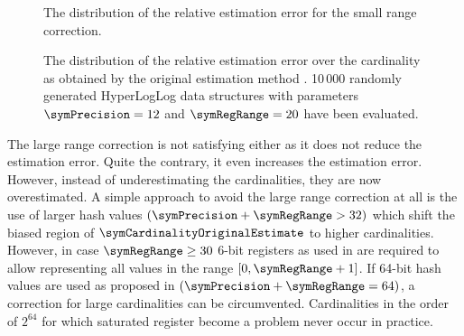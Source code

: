 \documentclass[a4paper]{scrartcl}
\begin{document}
\begin{figure}
\centering

\caption{The distribution of the relative estimation error for the small range correction.}
\label{fig:small_range_estimate}
\end{figure}

\begin{figure}
\centering

\caption{The distribution of the relative estimation error over the cardinality as obtained by the original estimation method \cite{Flajolet2007}. 10\,000 randomly generated HyperLogLog data structures with parameters $\symPrecision = 12$ and $\symRegRange=20$ have been evaluated.}
\label{fig:original_estimate}
\end{figure}

The large range correction is not satisfying either as it does not reduce the estimation error. Quite the contrary, it even increases the estimation error. However, instead of underestimating the cardinalities, they are now overestimated. A simple approach to avoid the large range correction at all is the use of larger hash values $(\symPrecision+\symRegRange>32)$ which shift the biased region of $\symCardinalityOriginalEstimate$ to higher cardinalities. However, in case $\symRegRange \geq 30$ 6-bit registers as used in \cite{Heule2013} are required to allow representing all values in the range $[0, \symRegRange+1]$. If 64-bit hash values are used as proposed in \cite{Heule2013} $(\symPrecision+\symRegRange=64)$, a correction for large cardinalities can be circumvented. Cardinalities in the order of $2^{64}$ for which saturated register become a problem never occur in practice.

%
\end{document}
